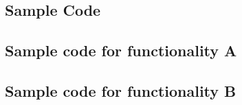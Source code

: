 \documentclass[12pt,a4paper,titlepage]{report}
\begin{document}
\begin{appendices}

\chapter{Sample Code}
\section{\normalsize Sample code for functionality A}
 \lstset{ tabsize=1,language=Python}
  

\section{\normalsize  Sample code for functionality B}
  


\end{appendices}
\end{document}
